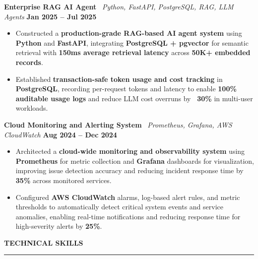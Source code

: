 \documentclass{article}
\begin{document}
\vspace{2mm}

{\large \noindent \textbf{Enterprise RAG AI Agent} \textbar\ \textit{Python, FastAPI, PostgreSQL, RAG, LLM Agents}} \hfill \textbf{Jan 2025 – Jul 2025}
\vspace{1mm}

{\small
\begin{itemize}[noitemsep, nolistsep, leftmargin=*, itemsep=1mm]

\item Constructed a \textbf{production-grade RAG-based AI agent system} using \textbf{Python} and \textbf{FastAPI}, integrating \textbf{PostgreSQL + pgvector} for semantic retrieval with \textbf{150ms average retrieval latency} across \textbf{50K+ embedded records}.

\item Established \textbf{transaction-safe token usage and cost tracking} in \textbf{PostgreSQL}, recording per-request tokens and latency to enable \textbf{100\% auditable usage logs} and reduce LLM cost overruns by \textbf{~30\%} in multi-user workloads.

\end{itemize}
}

\vspace{2mm}

{\large \noindent \textbf{Cloud Monitoring and Alerting System} \textbar\ \textit{Prometheus, Grafana, AWS CloudWatch}} \hfill \textbf{Aug 2024 – Dec 2024}
\vspace{1mm}

{\small
\begin{itemize}[noitemsep, nolistsep, leftmargin=*]

\item Architected a \textbf{cloud-wide monitoring and observability system} using \textbf{Prometheus} for metric collection and \textbf{Grafana} dashboards for visualization, improving issue detection accuracy and reducing incident response time by \textbf{35\%} across monitored services.

\item Configured \textbf{AWS CloudWatch} alarms, log-based alert rules, and metric thresholds to automatically detect critical system events and service anomalies, enabling real-time notifications and reducing response time for high-severity alerts by \textbf{25\%}.

\end{itemize}
}

\vspace{3mm}
\noindent \textbf{TECHNICAL SKILLS} \vspace{-8pt} \\
\rule{\linewidth}{0.5pt}
\end{document}
